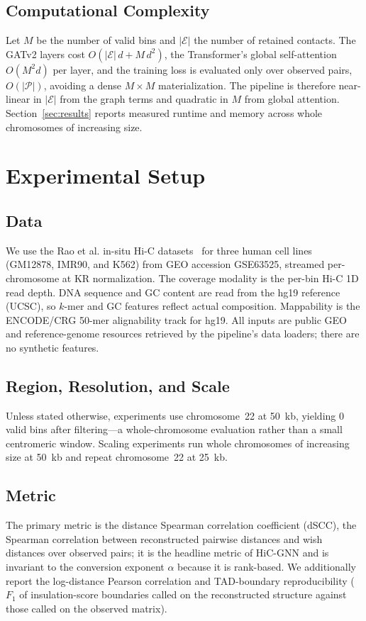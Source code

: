 \documentclass[conference]{IEEEtran}
\providecommand{\gfbins}{0}
\begin{document}
\subsection{Computational Complexity}
Let $M$ be the number of valid bins and $|\mathcal{E}|$ the number of retained
contacts. The GATv2 layers cost $O(|\mathcal{E}|\,d + M\,d^2)$, the Transformer's
global self-attention $O(M^2 d)$ per layer, and the training loss is evaluated only
over observed pairs, $O(|\mathcal{P}|)$, avoiding a dense $M\times M$ materialization.
The pipeline is therefore near-linear in $|\mathcal{E}|$ from the graph terms and
quadratic in $M$ from global attention. Section~\ref{sec:results} reports measured
runtime and memory across whole chromosomes of increasing size.

\section{Experimental Setup}
\subsection{Data}
We use the Rao et al. in-situ Hi-C datasets~\cite{rao2014} for three human cell
lines (GM12878, IMR90, and K562) from GEO accession GSE63525, streamed
per-chromosome at KR normalization. The coverage modality is the per-bin Hi-C 1D
read depth. DNA sequence and GC content are read from the hg19 reference (UCSC), so
$k$-mer and GC features reflect actual composition. Mappability is the ENCODE/CRG
50-mer alignability track for hg19. All inputs are public GEO and reference-genome
resources retrieved by the pipeline's data loaders; there are no synthetic features.

\subsection{Region, Resolution, and Scale}
Unless stated otherwise, experiments use chromosome~22 at 50~kb, yielding \gfbins{}
valid bins after filtering---a whole-chromosome evaluation rather than a small
centromeric window. Scaling experiments run whole
chromosomes of increasing size at 50~kb and repeat chromosome~22 at 25~kb.

\subsection{Metric}
The primary metric is the distance Spearman correlation coefficient (dSCC), the
Spearman correlation between reconstructed pairwise distances and wish distances
over observed pairs; it is the headline metric of HiC-GNN and is invariant to the
conversion exponent $\alpha$ because it is rank-based. We additionally report the
log-distance Pearson correlation and TAD-boundary reproducibility ($F_1$ of
insulation-score boundaries called on the reconstructed structure against those
called on the observed matrix).
\end{document}
